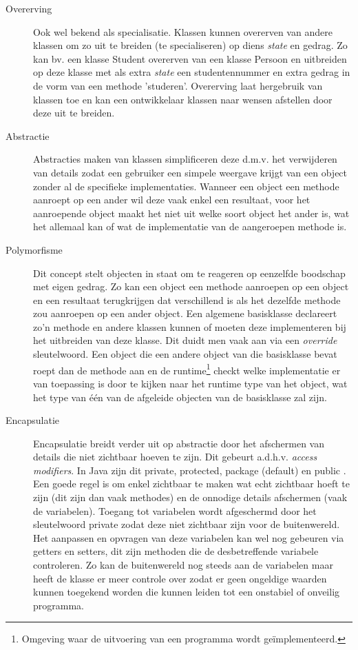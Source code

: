 \begin{description}
   \item[Overerving] Ook wel bekend als specialisatie. Klassen kunnen overerven van andere klassen om zo uit te breiden (te specialiseren) op diens \textit{state} en gedrag. Zo kan bv. een klasse Student overerven van een klasse Persoon en uitbreiden op deze klasse met als extra \textit{state} een studentennummer en extra gedrag in de vorm van een methode 'studeren'. 
    Overerving laat hergebruik van klassen toe en kan een ontwikkelaar klassen naar wensen afstellen door deze uit te breiden. 
    \item[Abstractie] Abstracties maken van klassen simplificeren deze d.m.v. het verwijderen van details zodat een gebruiker een simpele weergave krijgt van een object zonder al de specifieke implementaties. Wanneer een object een methode aanroept op een ander wil deze vaak enkel een resultaat, voor het aanroepende object maakt het niet uit welke soort object het ander is, wat het allemaal kan of wat de implementatie van de aangeroepen methode is.
    \item[Polymorfisme] Dit concept stelt objecten in staat om te reageren op eenzelfde boodschap met eigen gedrag. Zo kan een object een methode aanroepen op een object en een resultaat terugkrijgen dat verschillend is als het dezelfde methode zou aanroepen op een ander object. Een algemene basisklasse declareert zo'n methode en andere klassen kunnen of moeten deze implementeren bij het uitbreiden van deze klasse. Dit duidt men vaak aan via een \textit{override} sleutelwoord. Een object die een andere object van die basisklasse bevat roept dan de methode aan en de runtime\footnote{Omgeving waar de uitvoering van een programma wordt geïmplementeerd.} \autocite{Aho1986} checkt welke implementatie er van toepassing is door te kijken naar het runtime type van het object, wat het type van één van de afgeleide objecten van de basisklasse zal zijn.
    \item[Encapsulatie] Encapsulatie breidt verder uit op abstractie door het afschermen van details die niet zichtbaar hoeven te zijn. Dit gebeurt a.d.h.v. \textit{access modifiers}. In Java zijn dit private, protected, package (default) en public \autocite{Deitel2015}. Een goede regel is om enkel zichtbaar te maken wat echt zichtbaar hoeft te zijn (dit zijn dan vaak methodes) en de onnodige details afschermen (vaak de variabelen). Toegang tot variabelen wordt afgeschermd door het sleutelwoord private zodat deze niet zichtbaar zijn voor de buitenwereld. Het aanpassen en opvragen van deze variabelen kan wel nog gebeuren via getters en setters, dit zijn methoden die de desbetreffende variabele controleren. Zo kan de buitenwereld nog steeds aan de variabelen maar heeft de klasse er meer controle over zodat er geen ongeldige waarden kunnen toegekend worden die kunnen leiden tot een onstabiel of onveilig programma.
\end{description}

